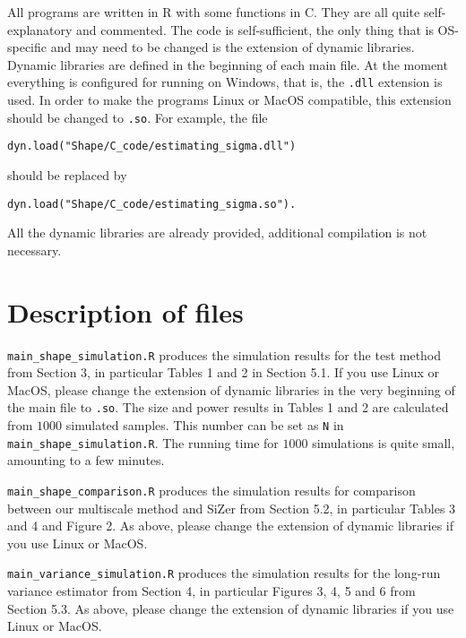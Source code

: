 \documentclass[a4paper,12pt]{article}
\begin{document}
All programs are written in R with some functions in C. They are all quite self-explanatory and commented. The code is self-sufficient, the only thing that is OS-specific and may need to be changed is the extension of dynamic libraries. Dynamic libraries are defined in the beginning of each main file. At the moment everything is configured for running on Windows, that is, the \verb|.dll| extension is used. In order to make the programs Linux or MacOS compatible, this extension should be changed to \verb|.so|. For example, the file
\begin{verbatim}
dyn.load("Shape/C_code/estimating_sigma.dll")
\end{verbatim} should be replaced by
\begin{verbatim}
dyn.load("Shape/C_code/estimating_sigma.so").
\end{verbatim}
All the dynamic libraries are already provided, additional  compilation is not necessary.



\newpage
\section*{Description of files}


\setlength{\parskip}{0.3cm}
\everypar{\hangafter=1\hangindent=1.45cm\relax}

\verb|main_shape_simulation.R| \hspace{1pt} produces the simulation results for the test method from Section 3, in particular Tables 1 and 2 in Section 5.1. If you use Linux or MacOS, please change the extension of dynamic libraries in the very beginning of the main file to \verb|.so|. The size and power results in Tables 1 and 2 are calculated from $1000$ simulated samples. This number can be set as \verb|N| in \verb|main_shape_simulation.R|. The running time for $1000$ simulations is quite small, amounting to a few minutes. 

\verb|main_shape_comparison.R| \hspace{1pt} produces the simulation results for comparison between our multiscale method and SiZer from Section 5.2, in particular Tables 3 and 4 and Figure 2. As above, please change the extension of dynamic libraries if you use Linux or MacOS.

\verb|main_variance_simulation.R| \hspace{1pt} produces the simulation results for the long-run variance estimator from Section 4, in particular Figures 3, 4, 5 and 6 from Section 5.3. As above, please change the extension of dynamic libraries if you use Linux or MacOS.
\end{document}
